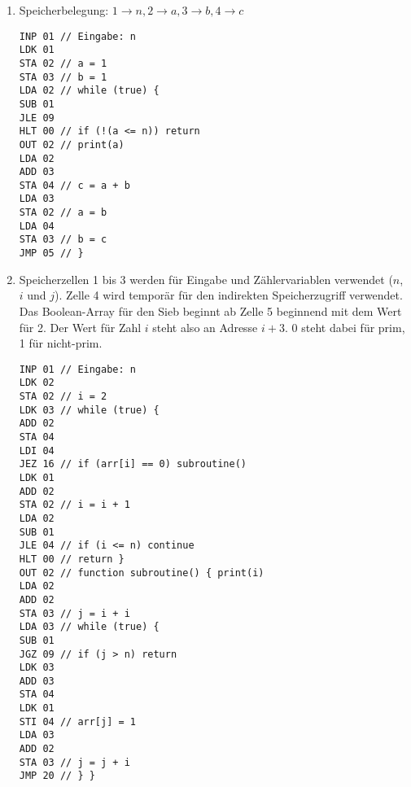 \documentclass[11pt,a4paper]{article}
\begin{document}
\begin{loesung}
\begin{enumerate}[label=\alph*)]
\item Speicherbelegung: $1 \rightarrow n, 2 \rightarrow a, 3 \rightarrow b, 4 \rightarrow c$\\
\begin{minipage}{\linewidth}
\begin{lstlisting}
INP 01 // Eingabe: n
LDK 01
STA 02 // a = 1
STA 03 // b = 1
LDA 02 // while (true) {
SUB 01
JLE 09 
HLT 00 // if (!(a <= n)) return
OUT 02 // print(a)
LDA 02
ADD 03
STA 04 // c = a + b
LDA 03
STA 02 // a = b
LDA 04
STA 03 // b = c
JMP 05 // }
\end{lstlisting}
\end{minipage}
\newpage
\item Speicherzellen 1 bis 3 werden für Eingabe und Zählervariablen verwendet ($n$, $i$ und $j$).
Zelle 4 wird temporär für den indirekten Speicherzugriff verwendet.
Das \glqq{}Boolean-Array\grqq{} für den Sieb beginnt ab Zelle 5 beginnend mit dem Wert für 2. 
Der Wert für Zahl $i$ steht also an Adresse $i + 3$.
0 steht dabei für prim, 1 für nicht-prim.\\
\begin{minipage}{\linewidth}
\begin{lstlisting}
INP 01 // Eingabe: n
LDK 02
STA 02 // i = 2
LDK 03 // while (true) {
ADD 02
STA 04
LDI 04
JEZ 16 // if (arr[i] == 0) subroutine()
LDK 01
ADD 02
STA 02 // i = i + 1
LDA 02
SUB 01 
JLE 04 // if (i <= n) continue
HLT 00 // return }
OUT 02 // function subroutine() { print(i)
LDA 02
ADD 02
STA 03 // j = i + i
LDA 03 // while (true) {
SUB 01
JGZ 09 // if (j > n) return
LDK 03
ADD 03
STA 04
LDK 01
STI 04 // arr[j] = 1
LDA 03
ADD 02
STA 03 // j = j + i
JMP 20 // } }
\end{lstlisting}
\end{minipage}
\end{enumerate}
\end{loesung}
\end{document}
